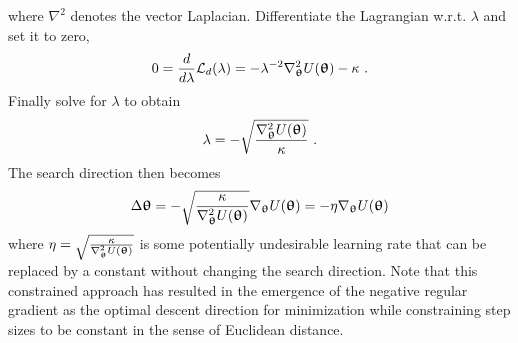where $\nabla^2$ denotes the vector Laplacian. Differentiate the Lagrangian w.r.t. $\lambda$ and set it to zero,
\begin{equation*}
    0 = \frac{d}{d\lambda}\mathcal{L}_d(\lambda) = -\lambda^{-2}\nabla^2_{\boldsymbol{\uptheta}} U({\boldsymbol{\uptheta}}) - \kappa \ .
\end{equation*}
Finally solve for $\lambda$ to obtain
\begin{equation}
    \lambda = - \sqrt{\frac{\nabla^2_{\boldsymbol{\uptheta}} U({\boldsymbol{\uptheta}})}{\kappa}} \ .
\end{equation}
The search direction then becomes
\begin{equation}
    \Delta{\boldsymbol{\uptheta}} = - \sqrt{\frac{\kappa}{\nabla^2_{\boldsymbol{\uptheta}} U({\boldsymbol{\uptheta}})}}\nabla_{\boldsymbol{\uptheta}} U({\boldsymbol{\uptheta}}) = -\eta\nabla_{\boldsymbol{\uptheta}} U({\boldsymbol{\uptheta}})
\end{equation}
where $\eta=\sqrt{\frac{\kappa}{\nabla^2_{\boldsymbol{\uptheta}} U({\boldsymbol{\uptheta}})}}$ is some potentially undesirable learning rate that can be replaced by a constant without changing the search direction. Note that this constrained approach has resulted in the emergence of the negative regular gradient as the optimal descent direction for minimization while constraining step sizes to be constant in the sense of Euclidean distance.

